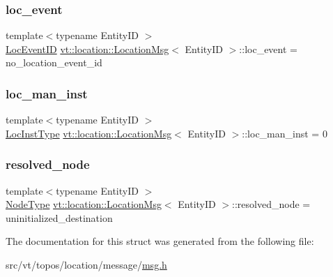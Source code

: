 \subsubsection{\texorpdfstring{loc\+\_\+event}{loc\_event}}
{\footnotesize\ttfamily template$<$typename Entity\+ID $>$ \\
\hyperlink{namespacevt_1_1location_aa5ccc1a42aa22b0b41fcfbbdee314dca}{Loc\+Event\+ID} \hyperlink{structvt_1_1location_1_1_location_msg}{vt\+::location\+::\+Location\+Msg}$<$ Entity\+ID $>$\+::loc\+\_\+event = no\+\_\+location\+\_\+event\+\_\+id}

\mbox{\label{structvt_1_1location_1_1_location_msg_ad685e327f058d12836ed9743d44b14b7}} 
\subsubsection{\texorpdfstring{loc\+\_\+man\+\_\+inst}{loc\_man\_inst}}
{\footnotesize\ttfamily template$<$typename Entity\+ID $>$ \\
\hyperlink{namespacevt_1_1location_a4db6456e8024af2d23fc5ae560fef866}{Loc\+Inst\+Type} \hyperlink{structvt_1_1location_1_1_location_msg}{vt\+::location\+::\+Location\+Msg}$<$ Entity\+ID $>$\+::loc\+\_\+man\+\_\+inst = 0}

\mbox{\label{structvt_1_1location_1_1_location_msg_a4c047bbd95901a1543e17e7924e1d2d3}} 
\subsubsection{\texorpdfstring{resolved\+\_\+node}{resolved\_node}}
{\footnotesize\ttfamily template$<$typename Entity\+ID $>$ \\
\hyperlink{namespacevt_a866da9d0efc19c0a1ce79e9e492f47e2}{Node\+Type} \hyperlink{structvt_1_1location_1_1_location_msg}{vt\+::location\+::\+Location\+Msg}$<$ Entity\+ID $>$\+::resolved\+\_\+node = uninitialized\+\_\+destination}



The documentation for this struct was generated from the following file\+:\begin{DoxyCompactItemize}
\item 
src/vt/topos/location/message/\hyperlink{msg_8h}{msg.\+h}\end{DoxyCompactItemize}
